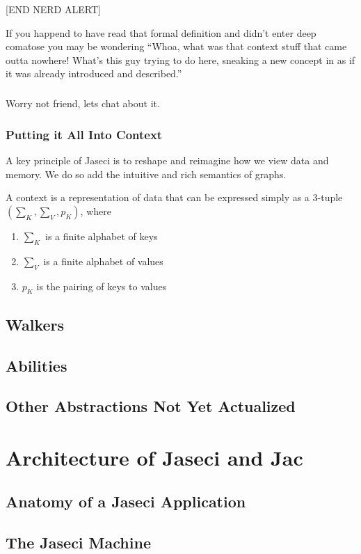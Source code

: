 \documentclass{book}
\begin{document}
[END NERD ALERT]

If you happend to have read that formal definition and didn't enter deep comatose you may be wondering ``Whoa, what was that context stuff that came outta nowhere! What's this guy trying to do here, sneaking a new concept in as if it was already introduced and described.''
\paragraph{}
Worry not friend, lets chat about it.
\subsection{Putting it All Into Context}

A key principle of Jaseci is to reshape and reimagine how we view data and memory. We do so add the intuitive and rich semantics of graphs.

A context is a representation of data that can be expressed simply as a $3$-tuple $(\sum_K,\sum_V,p_K)$, where
\begin{enumerate}
    \item $\sum_K$ is a finite alphabet of keys
    \item $\sum_V$ is a finite alphabet of values
    \item $p_K$ is the pairing of keys to values
\end{enumerate}

\section{Walkers}
\section{Abilities}
\section{Other Abstractions Not Yet Actualized}

\chapter{Architecture of Jaseci and Jac}
\section{Anatomy of a Jaseci Application}
\section{The Jaseci Machine}
\end{document}
